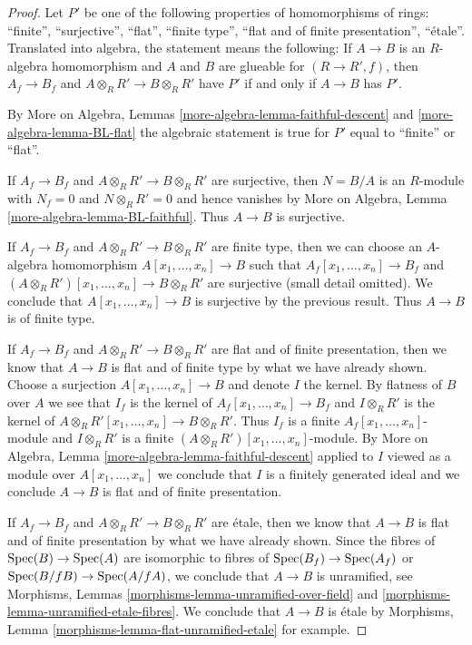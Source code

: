 \begin{proof}
Let $P'$ be one of the following properties of homomorphisms of rings:
``finite'', ``surjective'', ``flat'', ``finite type'',
``flat and of finite presentation'', ``\'etale''.
Translated into algebra, the statement means the following:
If $A \to B$ is an $R$-algebra homomorphism and $A$ and $B$
are glueable for $(R \to R', f)$, then
$A_f \to B_f$ and $A \otimes_R R' \to B \otimes_R R'$ have $P'$
if and only if $A \to B$ has $P'$.

\medskip\noindent
By More on Algebra, Lemmas \ref{more-algebra-lemma-faithful-descent}
and \ref{more-algebra-lemma-BL-flat} the algebraic statement
is true for $P'$ equal to ``finite'' or ``flat''.

\medskip\noindent
If $A_f \to B_f$ and $A \otimes_R R' \to B \otimes_R R'$ are surjective,
then $N = B/A$ is an $R$-module with $N_f = 0$ and $N \otimes_R R' = 0$ and
hence vanishes by More on Algebra, Lemma
\ref{more-algebra-lemma-BL-faithful}. Thus $A \to B$ is surjective.

\medskip\noindent
If $A_f \to B_f$ and $A \otimes_R R' \to B \otimes_R R'$ are finite type,
then we can choose an $A$-algebra homomorphism $A[x_1, \ldots, x_n] \to B$
such that $A_f[x_1, \ldots, x_n] \to B_f$ and
$(A \otimes_R R')[x_1, \ldots, x_n] \to B \otimes_R R'$ are surjective
(small detail omitted). We conclude that $A[x_1, \ldots, x_n] \to B$
is surjective by the previous result. Thus $A \to B$ is of finite type.

\medskip\noindent
If $A_f \to B_f$ and $A \otimes_R R' \to B \otimes_R R'$ are
flat and of finite presentation, then we know that $A \to B$ is flat and
of finite type by what we have already shown. Choose a surjection
$A[x_1, \ldots, x_n] \to B$ and denote $I$ the kernel.
By flatness of $B$ over $A$ we see that $I_f$ is the kernel of
$A_f[x_1, \ldots, x_n] \to B_f$ and $I \otimes_R R'$ is the kernel of
$A \otimes_R R'[x_1, \ldots, x_n] \to B \otimes_R R'$.
Thus $I_f$ is a finite $A_f[x_1, \ldots, x_n]$-module and
$I \otimes_R R'$ is a finite $(A \otimes_R R')[x_1, \ldots, x_n]$-module.
By More on Algebra, Lemma \ref{more-algebra-lemma-faithful-descent}
applied to $I$ viewed as a module over $A[x_1, \ldots, x_n]$
we conclude that $I$ is a finitely generated ideal and we conclude
$A \to B$ is flat and of finite presentation.

\medskip\noindent
If $A_f \to B_f$ and $A \otimes_R R' \to B \otimes_R R'$ are \'etale,
then we know that $A \to B$ is flat and of finite presentation by what
we have already shown. Since the fibres of $\operatorname{Spec}(B) \to \operatorname{Spec}(A)$
are isomorphic to fibres of $\operatorname{Spec}(B_f) \to \operatorname{Spec}(A_f)$ or
$\operatorname{Spec}(B/fB) \to \operatorname{Spec}(A/fA)$, we conclude that $A \to B$ is unramified,
see Morphisms, Lemmas \ref{morphisms-lemma-unramified-over-field}
and \ref{morphisms-lemma-unramified-etale-fibres}.
We conclude that $A \to B$ is \'etale by
Morphisms, Lemma \ref{morphisms-lemma-flat-unramified-etale} for example.
\end{proof}

